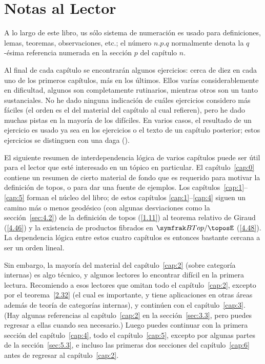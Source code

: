 \chapter*{Notas al Lector}
\label{chap:notas_al_lector}

A lo largo de este libro, us sólo sistema de numeración es usado para
definiciones, lemas, teoremas, observaciones, etc.; 
el número \(n.p.q\) normalmente denota la \(q\)-ésima referencia numerada en la
sección \(p\) del capítulo \(n\). 

Al final de cada capítulo se encontrarán algunos ejercicios: cerca de diez en
cada uno de los primeros capítulos, más en los últimos. Ellos varías
considerablemente en dificultad, algunos son completamente rutinarios, mientras
otros son un tanto sustanciales. No he dado ninguna indicación de cuáles
ejercicios considero más fáciles (el orden es el del material del capítulo al
cual refieren), pero he dado muchas pistas en la mayoría de los difíciles. En
varios casos, el resultado de un ejercicio es usado ya sea en los ejercicios o
el texto de un capítulo posterior; estos ejercicios se distinguen con una daga
(\dagger).

El siguiente resumen de interdependencia lógica de varios capítulos puede ser
útil para el lector que esté interesado en un tópico en particular. El
capítulo~\ref{cap:0} contiene un resumen de cierto material de fondo que es
requerido para motivar la definición de topos, o para dar una fuente de
ejemplos. Los capítulos~\ref{cap:1}--\ref{cap:5} forman el núcleo del libro; de
estos capítulos \ref{cap:1}--\ref{cap:4} siguen un camino más o menos geodésico
(con algunas desviaciones como la sección~\ref{sec:4.2}) de la definición de
topos (\ref{1.11}) al teorema relativo de Giraud (\ref{4.46}) y la existencia de
productos fibrados en \(\betop\) (\ref{4.48}). La dependencia lógica entre estos
cuatro capítulos es entonces bastante cercana a ser un orden lineal.

Sin embargo, la mayoría del material del capítulo~\ref{cap:2} (sobre categoría
internas) es algo técnico, y algunos lectores lo encontrar difícil en la primera
lectura. Recomiendo a esos lectores que omitan todo el capítulo~\ref{cap:2},
excepto por el teorema~\ref{2.32} (el cual es importante, y tiene aplicaciones
en otras áreas además de teoría de categorías internas), y continúen con el
capítulo~\ref{cap:3}. (Hay algunas referencias al capítulo~\ref{cap:2} en la
sección~\ref{sec:3.3}, pero puedes regresar a ellas cuando sea necesario.) Luego
puedes continuar con la primera sección del capítulo~\ref{cap:4}, todo el
capítulo~\ref{cap:5}, excepto por algunas partes de la sección~\ref{sec:5.3}, e
incluso las primeras dos secciones del capítulo~\ref{cap:6} antes de regresar al
capítulo~\ref{cap:2}.

